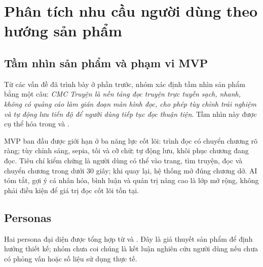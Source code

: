 
\section{Phân tích nhu cầu người dùng theo hướng sản phẩm}

\subsection{Tầm nhìn sản phẩm và phạm vi MVP}

Từ các vấn đề đã trình bày ở phần trước, nhóm xác định tầm nhìn sản phẩm bằng một câu: \textit{CMC Truyện là nền tảng đọc truyện trực tuyến sạch, nhanh, không có quảng cáo làm gián đoạn màn hình đọc, cho phép tùy chỉnh trải nghiệm và tự động lưu tiến độ để người dùng tiếp tục đọc thuận tiện}. Tầm nhìn này được cụ thể hóa trong  và .

MVP ban đầu được giới hạn ở ba năng lực cốt lõi: trình đọc có chuyển chương rõ ràng; tùy chỉnh sáng, sepia, tối và cỡ chữ; tự động lưu, khôi phục chương đang đọc. Tiêu chí kiểm chứng là người dùng có thể vào trang, tìm truyện, đọc và chuyển chương trong dưới 30 giây; khi quay lại, hệ thống mở đúng chương dở. AI tóm tắt, gợi ý cá nhân hóa, bình luận và quản trị nâng cao là lớp mở rộng, không phải điều kiện để giá trị đọc cốt lõi tồn tại.

\subsection{Personas}

Hai persona đại diện được tổng hợp từ  và . Đây là giả thuyết sản phẩm để định hướng thiết kế; nhóm chưa coi chúng là kết luận nghiên cứu người dùng nếu chưa có phỏng vấn hoặc số liệu sử dụng thực tế.

